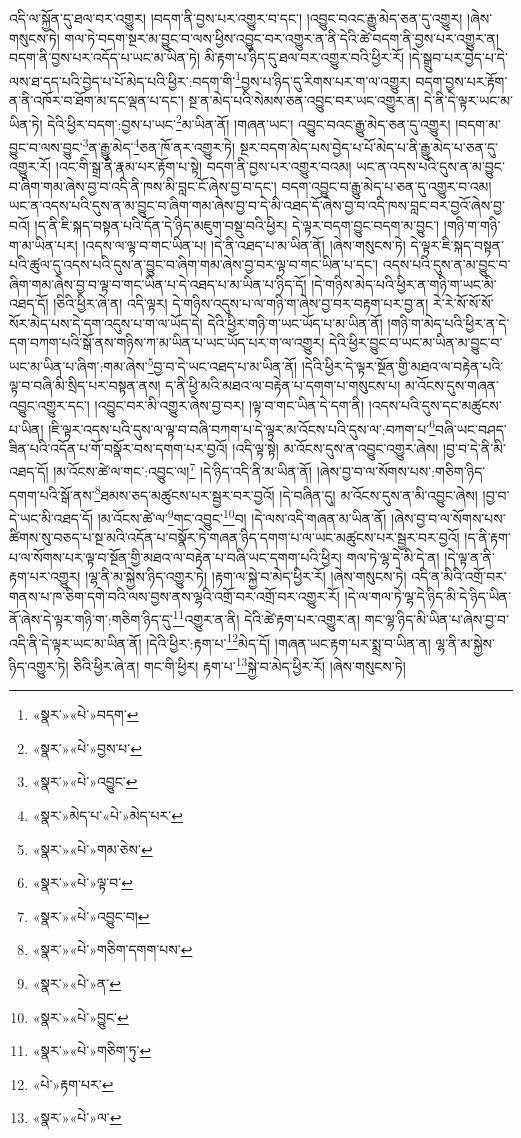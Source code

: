 འདི་ལ་སྐྱོན་དུ་ཐལ་བར་འགྱུར། །བདག་ནི་བྱས་པར་འགྱུར་བ་དང་། །འབྱུང་བའང་རྒྱུ་མེད་ཅན་དུ་འགྱུར། །ཞེས་གསུངས་ཏེ། གལ་ཏེ་བདག་སྔར་མ་བྱུང་བ་ལས་ཕྱིས་འབྱུང་བར་འགྱུར་ན་ནི་དེའི་ཚེ་བདག་ནི་བྱས་པར་འགྱུར་ན། བདག་ནི་བྱས་པར་འདོད་པ་ཡང་མ་ཡིན་ཏེ། མི་རྟག་པ་ཉིད་དུ་ཐལ་བར་འགྱུར་བའི་ཕྱིར་རོ། །དེ་སྒྲུབ་པར་བྱེད་པ་དེ་ལས་ཐ་དད་པའི་བྱེད་པ་པོ་མེད་པའི་ཕྱིར་:བདག་གི་\footnote{«སྣར་»«པེ་»བདག་}བྱས་པ་ཉིད་དུ་རིགས་པར་ག་ལ་འགྱུར། བདག་བྱས་པར་རྟོག་ན་ནི་འཁོར་བ་ཐོག་མ་དང་ལྡན་པ་དང་། སྔ་ན་མེད་པའི་སེམས་ཅན་འབྱུང་བར་ཡང་འགྱུར་ན། དེ་ནི་དེ་ལྟར་ཡང་མ་ཡིན་ཏེ། དེའི་ཕྱིར་བདག་:བྱས་པ་ཡང་\footnote{«སྣར་»«པེ་»བྱས་པ་}མ་ཡིན་ནོ། །གཞན་ཡང་། འབྱུང་བའང་རྒྱུ་མེད་ཅན་དུ་འགྱུར། །བདག་མ་བྱུང་བ་ལས་བྱུང་\footnote{«སྣར་»«པེ་»འབྱུང་}ན་རྒྱུ་མེད་\footnote{«སྣར་»མེད་པ་«པེ་»མེད་པར་}ཅན་ཁོ་ནར་འགྱུར་ཏེ། སྔར་བདག་མེད་པས་བྱེད་པ་པོ་མེད་པ་ནི་རྒྱུ་མེད་པ་ཅན་དུ་འགྱུར་རོ། །འང་གི་སྒྲ་ནི་རྣམ་པར་རྟོག་པ་སྟེ། བདག་ནི་བྱས་པར་འགྱུར་བའམ། ཡང་ན་འདས་པའི་དུས་ན་མ་བྱུང་བ་ཞིག་གམ་ཞེས་བྱ་བ་འདི་ནི་ཁས་མི་བླང་ངོ་ཞེས་བྱ་བ་དང་། བདག་འབྱུང་བ་རྒྱུ་མེད་པ་ཅན་དུ་འགྱུར་བ་འམ། ཡང་ན་འདས་པའི་དུས་ན་མ་བྱུང་བ་ཞིག་གམ་ཞེས་བྱ་བ་དེ་མི་འཐད་དོ་ཞེས་བྱ་བ་འདི་ཁས་བླང་བར་བྱའོ་ཞེས་བྱ་བའོ། །ད་ནི་ཇི་སྐད་བསྟན་པའི་དོན་དེ་ཉིད་མཇུག་བསྡུ་བའི་ཕྱིར། དེ་ལྟར་བདག་བྱུང་བདག་མ་བྱུང་། །གཉི་ག་གཉི་ག་མ་ཡིན་པར། །འདས་ལ་ལྟ་བ་གང་ཡིན་པ། །དེ་ནི་འཐད་པ་མ་ཡིན་ནོ། །ཞེས་གསུངས་ཏེ། དེ་ལྟར་ཇི་སྐད་བསྟན་པའི་ཚུལ་དུ་འདས་པའི་དུས་ན་བྱུང་བ་ཞིག་གམ་ཞེས་བྱ་བར་ལྟ་བ་གང་ཡིན་པ་དང་། འདས་པའི་དུས་ན་མ་བྱུང་བ་ཞིག་གམ་ཞེས་བྱ་བ་ལྟ་བ་གང་ཡིན་པ་དེ་འཐད་པ་མ་ཡིན་པ་ཉིད་དོ། །དེ་གཉིས་མེད་པའི་ཕྱིར་ན་གཉི་ག་ཡང་མི་འཐད་དོ། །ཅིའི་ཕྱིར་ཞེ་ན། འདི་ལྟར། དེ་གཉིས་འདུས་པ་ལ་གཉི་ག་ཞེས་བྱ་བར་བརྟག་པར་བྱ་ན། རེ་རེ་སོ་སོ་སོ་སོར་མེད་པས་དེ་དག་འདུས་པ་ག་ལ་ཡོད་དེ། དེའི་ཕྱིར་གཉི་ག་ཡང་ཡོད་པ་མ་ཡིན་ནོ། །གཉི་ག་མེད་པའི་ཕྱིར་ན་དེ་དག་བཀག་པའི་སྒོ་ནས་གཉིས་ཀ་མ་ཡིན་པ་ཡང་ཡོད་པར་ག་ལ་འགྱུར། དེའི་ཕྱིར་བྱུང་བ་ཡང་མ་ཡིན་མ་བྱུང་བ་ཡང་མ་ཡིན་པ་ཞིག་:གམ་ཞེས་\footnote{«སྣར་»«པེ་»གམ་ཅེས་}བྱ་བ་དེ་ཡང་འཐད་པ་མ་ཡིན་ནོ། །དེའི་ཕྱིར་དེ་ལྟར་སྔོན་གྱི་མཐའ་ལ་བརྟེན་པའི་ལྟ་བ་བཞི་མི་སྲིད་པར་བསྟན་ནས། ད་ནི་ཕྱི་མའི་མཐའ་ལ་བརྟེན་པ་དགག་པ་གསུངས་པ། མ་འོངས་དུས་གཞན་འབྱུང་འགྱུར་དང་། །འབྱུང་བར་མི་འགྱུར་ཞེས་བྱ་བར། །ལྟ་བ་གང་ཡིན་དེ་དག་ནི། །འདས་པའི་དུས་དང་མཚུངས་པ་ཡིན། །ཇི་ལྟར་འདས་པའི་དུས་ལ་ལྟ་བ་བཞི་བཀག་པ་དེ་ལྟར་མ་འོངས་པའི་དུས་ལ་:བཀག་པ་\footnote{«སྣར་»«པེ་»ལྟ་བ་}བཞི་ཡང་བཤད་ཟིན་པའི་འདོན་པ་གོ་བསྣོར་བས་དགག་པར་བྱའོ། །འདི་ལྟ་སྟེ། མ་འོངས་དུས་ན་འབྱུང་འགྱུར་ཞེས། །བྱ་བ་དེ་ནི་མི་འཐད་དོ། །མ་འོངས་ཚེ་ལ་གང་:འབྱུང་ལ།\footnote{«སྣར་»«པེ་»འབྱུང་བ།} །དེ་ཉིད་འདི་ནི་མ་ཡིན་ནོ། །ཞེས་བྱ་བ་ལ་སོགས་པས་:གཅིག་ཉིད་དགག་པའི་སྒོ་ནས་\footnote{«སྣར་»«པེ་»གཅིག་དགག་པས་}ཐམས་ཅད་མཚུངས་པར་སྦྱར་བར་བྱའོ། །དེ་བཞིན་དུ། མ་འོངས་དུས་ན་མི་འབྱུང་ཞེས། །བྱ་བ་དེ་ཡང་མི་འཐད་དོ། །མ་འོངས་ཚེ་ལ་\footnote{«སྣར་»«པེ་»ན་}གང་འབྱུང་\footnote{«སྣར་»«པེ་»བྱུང་}བ། །དེ་ལས་འདི་གཞན་མ་ཡིན་ནོ། །ཞེས་བྱ་བ་ལ་སོགས་པས་ཚིགས་སུ་བཅད་པ་སྔ་མའི་འདོན་པ་བསྣོར་ཏེ་གཞན་ཉིད་དགག་པ་ལ་ཡང་མཚུངས་པར་སྦྱར་བར་བྱའོ། །ད་ནི་རྟག་པ་ལ་སོགས་པར་ལྟ་བ་སྔོན་གྱི་མཐའ་ལ་བརྟེན་པ་བཞི་ཡང་དགག་པའི་ཕྱིར། གལ་ཏེ་ལྷ་དེ་མི་དེ་ན། །དེ་ལྟ་ན་ནི་རྟག་པར་འགྱུར། །ལྷ་ནི་མ་སྐྱེས་ཉིད་འགྱུར་ཏེ། །རྟག་ལ་སྐྱེ་བ་མེད་ཕྱིར་རོ། །ཞེས་གསུངས་ཏེ། འདི་ན་མིའི་འགྲོ་བར་གནས་པ་ཁ་ཅིག་དགེ་བའི་ལས་བྱས་ནས་ལྷའི་འགྲོ་བར་འགྲོ་བར་འགྱུར་རོ། །དེ་ལ་གལ་ཏེ་ལྷ་དེ་ཉིད་མི་དེ་ཉིད་ཡིན་ནོ་ཞེས་དེ་ལྟར་གཉི་ག་:གཅིག་ཉིད་དུ་\footnote{«སྣར་»«པེ་»གཅིག་ཏུ་}འགྱུར་ན་ནི། དེའི་ཚེ་རྟག་པར་འགྱུར་ན། གང་ལྷ་ཉིད་མི་ཡིན་པ་ཞེས་བྱ་བ་འདི་ནི་དེ་ལྟར་ཡང་མ་ཡིན་ནོ། །དེའི་ཕྱིར་:རྟག་པ་\footnote{«པེ་»རྟག་པར་}མེད་དོ། །གཞན་ཡང་རྟག་པར་སྨྲ་བ་ཡིན་ན། ལྷ་ནི་མ་སྐྱེས་ཉིད་འགྱུར་ཏེ། ཅིའི་ཕྱིར་ཞེ་ན། གང་གི་ཕྱིར། རྟག་པ་\footnote{«སྣར་»«པེ་»ལ་}སྐྱེ་བ་མེད་ཕྱིར་རོ། །ཞེས་གསུངས་ཏེ། 